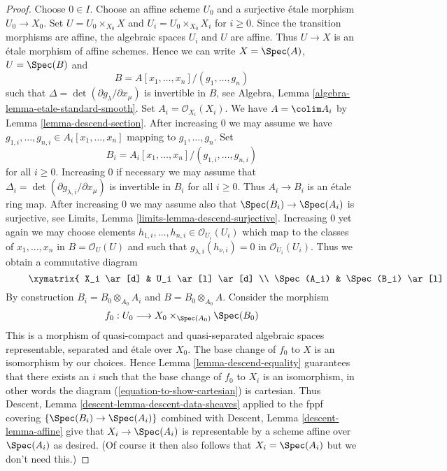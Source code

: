 \begin{proof}
Choose $0 \in I$. Choose an affine scheme $U_0$ and a surjective
\'etale morphism $U_0 \to X_0$. Set $U = U_0 \times_{X_0} X$
and $U_i = U_0 \times_{X_0} X_i$ for $i \geq 0$. Since the transition
morphisms are affine, the algebraic spaces $U_i$ and $U$ are affine.
Thus $U \to X$ is an \'etale morphism of affine schemes. Hence we
can write $X = \Spec(A)$, $U = \Spec(B)$ and
$$
B = A[x_1, \ldots, x_n]/(g_1, \ldots, g_n)
$$
such that $\Delta = \det(\partial g_\lambda/\partial x_\mu)$ is invertible
in $B$, see Algebra, Lemma \ref{algebra-lemma-etale-standard-smooth}.
Set $A_i = \mathcal{O}_{X_i}(X_i)$. We have $A = \colim A_i$ by
Lemma \ref{lemma-descend-section}. After increasing $0$ we may assume
we have $g_{1, i}, \ldots, g_{n, i} \in A_i[x_1, \ldots, x_n]$ mapping to
$g_1, \ldots, g_n$. Set
$$
B_i = A_i[x_1, \ldots, x_n]/(g_{1, i}, \ldots, g_{n, i})
$$
for all $i \geq 0$. Increasing $0$ if necessary we may assume that
$\Delta_i = \det(\partial g_{\lambda, i}/\partial x_\mu)$ is invertible
in $B_i$ for all $i \geq 0$. Thus $A_i \to B_i$ is an \'etale ring map.
After increasing $0$ we may assume also that
$\Spec(B_i) \to \Spec(A_i)$ is surjective, see
Limits, Lemma \ref{limits-lemma-descend-surjective}. Increasing
$0$ yet again we may choose elements
$h_{1, i}, \ldots, h_{n, i} \in \mathcal{O}_{U_i}(U_i)$ which map to the
classes of $x_1, \ldots, x_n$ in $B = \mathcal{O}_U(U)$ and such that
$g_{\lambda, i}(h_{\nu, i}) = 0$ in $\mathcal{O}_{U_i}(U_i)$. Thus
we obtain a commutative diagram
\begin{equation}
\label{equation-to-show-cartesian}
\vcenter{
\xymatrix{
X_i \ar[d] & U_i \ar[l] \ar[d] \\
\Spec(A_i) & \Spec(B_i) \ar[l]
}
}
\end{equation}
By construction $B_i = B_0 \otimes_{A_0} A_i$ and
$B = B_0 \otimes_{A_0} A$. Consider the morphism
$$
f_0 : U_0 \longrightarrow X_0 \times_{\Spec(A_0)} \Spec(B_0)
$$
This is a morphism of quasi-compact and quasi-separated algebraic spaces
representable, separated and \'etale over $X_0$. The base change of $f_0$
to $X$ is an isomorphism by our choices. Hence
Lemma \ref{lemma-descend-equality}
guarantees that there exists an $i$ such that the base change of $f_0$
to $X_i$ is an isomorphism, in other words the diagram
(\ref{equation-to-show-cartesian}) is cartesian. Thus
Descent, Lemma \ref{descent-lemma-descent-data-sheaves}
applied to the fppf covering $\{\Spec(B_i) \to \Spec(A_i)\}$
combined with Descent, Lemma \ref{descent-lemma-affine}
give that $X_i \to \Spec(A_i)$ is representable by a scheme
affine over $\Spec(A_i)$ as desired. (Of course it then also follows
that $X_i = \Spec(A_i)$ but we don't need this.)
\end{proof}


